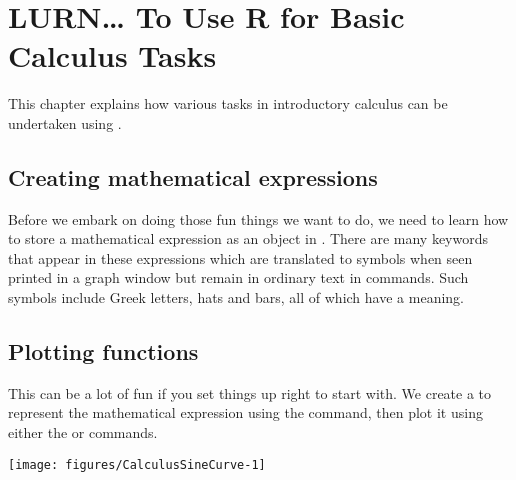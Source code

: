 

 
\chapter{LURN\ldots{} To Use R for Basic Calculus Tasks} 
\label{Calculus} 
 

 
This chapter explains how various tasks in introductory calculus can be undertaken using \R{}. 
 
 
\section{Creating mathematical expressions} 
 
Before we embark on doing those fun things we want to do, we need to learn how to store a mathematical expression as an object in \R{}. There are many keywords that appear in these expressions which are translated to symbols when seen printed in a graph window but remain in ordinary text in \R{} commands. Such symbols include Greek letters, hats and bars, all of which have a meaning. 
 
\section{Plotting functions} 
 
This can be a lot of fun if you set things up right to start with. We create a  to represent the mathematical expression using the  command, then plot it using either the  or  commands. 
\begin{knitrout}
\color{fgcolor}\begin{kframe}
\begin{alltt}
\hlstd{> } \hlkwb{<-} \hlstd{(}\hlstd{)\{} 
\hlstd{> } \hlopt{-}\hlopt{*} \hlopt{*}  \hlstd{=} \hlstd{)}
\end{alltt}
\end{kframe}
\texttt{[image: figures/CalculusSineCurve-1]} 

\end{knitrout}
 
